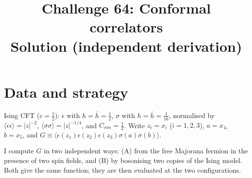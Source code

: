 \documentclass[11pt]{article}
\title{Challenge 64: Conformal correlators \\ \large Solution (independent derivation)}
\date{}
\begin{document}
\maketitle

\section{Data and strategy}
Ising CFT ($c=\frac12$): $\epsilon$ with $h=\bar h=\frac12$, $\sigma$ with $h=\bar h=\frac1{16}$, normalised by $\langle\epsilon\epsilon\rangle=|z|^{-2}$, $\langle\sigma\sigma\rangle=|z|^{-1/4}$, and $C_{\sigma\sigma\epsilon}=\frac12$. Write $z_i=x_i$ ($i=1,2,3$), $a=x_4$, $b=x_5$, and $G\equiv\langle\epsilon(z_1)\epsilon(z_2)\epsilon(z_3)\sigma(a)\sigma(b)\rangle$.

I compute $G$ in two independent ways: (A) from the free Majorana fermion in the presence of two spin fields, and (B) by bosonising two copies of the Ising model. Both give the same function; they are then evaluated at the two configurations.
\end{document}
